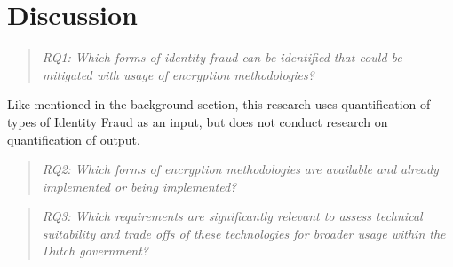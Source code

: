 \chapter{Discussion}\label{s:discussion}


\begin{quote}\emph{RQ1: Which forms of identity fraud can be identified that could be mitigated with usage of encryption methodologies?}\end{quote}
Like mentioned in the background section, this research uses quantification of types of Identity Fraud as an input, but does not conduct research on quantification of output.
\begin{quote}\emph{RQ2: Which forms of encryption methodologies are available and already implemented or being implemented?}\end{quote}
\begin{quote}\emph{RQ3: Which requirements are significantly relevant to assess technical suitability and trade offs of these technologies for broader usage within the Dutch government?}\end{quote}

